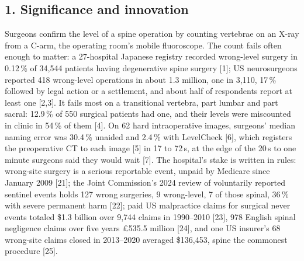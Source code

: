 \documentclass[10pt,letterpaper]{article}
\newcommand{\pct}{\,\%}
\begin{document}
\subsection*{1. Significance and innovation}
Surgeons confirm the level of a spine operation by counting vertebrae on an X-ray from a C-arm, the operating room's
mobile fluoroscope. The count fails often enough to matter: a 27-hospital Japanese registry recorded wrong-level
surgery in 0.12\pct{} of 34,544 patients having degenerative spine surgery [1]; US
neurosurgeons reported 418 wrong-level operations in about 1.3 million, one in 3,110, 17\pct{} followed by legal action or a settlement, and about half of respondents report at least one [2,3]. It fails most on a transitional vertebra, part
lumbar and part sacral: 12.9\pct{} of 550 surgical patients had one, and their levels were miscounted in clinic in
54\pct{} of them [4]. On 62 hard intraoperative images, surgeons' median naming error was 30.4\pct{}
unaided and 2.4\pct{} with LevelCheck [6], which registers the preoperative CT to each image [5] in 17 to 72\,s, at
the edge of the 20\,s to one minute surgeons said they would wait [7]. The hospital's stake is
written in rules: wrong-site surgery is a serious reportable event, unpaid by Medicare since January 2009 [21]; the
Joint Commission's 2024 review of voluntarily reported sentinel events holds 127 wrong surgeries, 9
wrong-level, 7 of those spinal, 36\pct{} with severe permanent harm [22]; paid US malpractice claims for surgical never
events totaled \$1.3 billion over 9,744 claims in 1990--2010 [23], 978 English spinal negligence claims over five
years \pounds535.5 million [24], and one US insurer's 68 wrong-site claims closed in 2013--2020 averaged \$136,453, spine the
commonest procedure [25].
\end{document}
